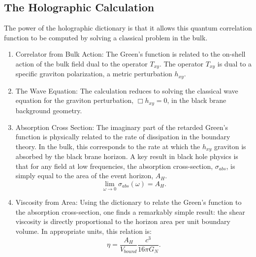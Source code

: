 \documentclass[11pt, letterpaper]{report}
\theoremstyle{plain} %
\theoremstyle{definition} %
\theoremstyle{remark} %
\begin{document}
\subsection{The Holographic Calculation}
The power of the holographic dictionary is that it allows this quantum correlation function to be computed by solving a classical problem in the bulk.
\begin{enumerate}
    \item Correlator from Bulk Action: The Green's function is related to the on-shell action of the bulk field dual to the operator $T_{xy}$. The operator $T_{xy}$ is dual to a specific graviton polarization, a metric perturbation $h_{xy}$.
    \item The Wave Equation: The calculation reduces to solving the classical wave equation for the graviton perturbation, $\Box h_{xy} = 0$, in the black brane background geometry.
    \item Absorption Cross Section: The imaginary part of the retarded Green's function is physically related to the rate of dissipation in the boundary theory. In the bulk, this corresponds to the rate at which the $h_{xy}$ graviton is absorbed by the black brane horizon. A key result in black hole physics is that for any field at low frequencies, the absorption cross-section, $\sigma_{abs}$, is simply equal to the area of the event horizon, $A_H$.
    \begin{equation}
        \lim_{\omega\to 0} \sigma_{abs}(\omega) = A_H.
    \end{equation}
    \item Viscosity from Area: Using the dictionary to relate the Green's function to the absorption cross-section, one finds a remarkably simple result: the shear viscosity is directly proportional to the horizon area per unit boundary volume. In appropriate units, this relation is:
    \begin{equation}
        \eta = \frac{A_H}{V_{bound}} \frac{c^3}{16\pi G_N}.
    \end{equation}
\end{enumerate}
\end{document}
